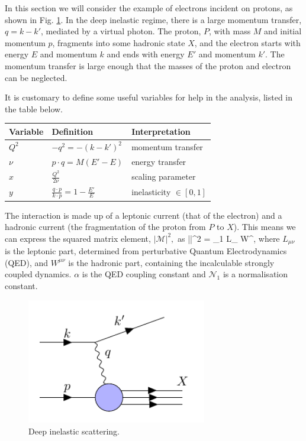 In this section we will consider the example of electrons incident on protons, as shown in Fig. \ref{fig:dis}. In the deep inelastic regime, there is a large momentum transfer, $q=k-k'$, mediated by a virtual photon. The proton, $P$, with mass $M$ and initial momentum $p$, fragments into some hadronic state $X$, and the electron starts with energy $E$ and momentum $k$ and ends with energy $E'$ and momentum $k'$. The momentum transfer is large enough that the masses of the proton and electron can be neglected. 

It is customary to define some useful variables for help in the analysis, listed in the table below.
\begin{table}[H]
\centering
\begin{tabular}{l|l|l}
  Variable & Definition & Interpretation   \\
 \hline
  $Q^2$ & $- q^2 = -(k-k')^2$   & momentum transfer    \\
  $\nu$ & $p \cdot q = M(E'-E)$ & energy transfer  \\
  $x$   & $\frac{Q^2}{2\nu}$    & scaling parameter \\
  $y$   & $\frac{q \cdot p}{k \cdot p} = 1 - \frac{E'}{E}$ & inelasticity $\in [0,1]$
\end{tabular}
\end{table}
The interaction is made up of a leptonic current (that of the electron) and a hadronic current (the fragmentation of the proton from $P$ to $X$). This means we can express the squared matrix element, $|\mathcal{M}|^2,$ as
\be
\label{eqn:matrixelement}
||^2 = _1  L_{\mu\nu} W^{\mu\nu},
\ee
where $L_{\mu\nu}$ is the leptonic part, determined from perturbative Quantum Electrodynamics (QED), and $W^{\mu\nu}$ is the hadronic part, containing the incalculable strongly coupled dynamics. $\alpha$ is the QED coupling constant and $\mathcal{N}_1$ is a normalisation constant.
\begin{figure}[H]
\centering
\includegraphics[width=0.7\textwidth]{../diagrams/disdiag.pdf}
\caption{Deep inelastic scattering. \label{fig:dis}}
\end{figure}

